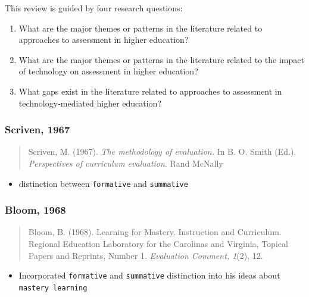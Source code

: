\documentclass[
]{book}
\providecommand{\tightlist}{%
  \setlength{\itemsep}{0pt}\setlength{\parskip}{0pt}}
\begin{document}
This review is guided by four research questions:

\begin{enumerate}
\def\labelenumi{\arabic{enumi}.}
\tightlist
\item
  What are the major themes or patterns in the literature related to approaches to assessment in higher education?\\
\item
  What are the major themes or patterns in the literature related to the impact of technology on assessment in higher education?\\
\item
  What gaps exist in the literature related to approaches to assessment in technology-mediated higher education?
\end{enumerate}

\hypertarget{scriven-1967}{%
\subsubsection*{Scriven, 1967}\label{scriven-1967}}

\begin{quote}
Scriven, M. (1967). \emph{The methodology of evaluation.} In B. O. Smith (Ed.), \emph{Perspectives of curriculum evaluation}. Rand McNally
\end{quote}

\begin{itemize}
\tightlist
\item
  distinction between \texttt{formative} and \texttt{summative}
\end{itemize}

\hypertarget{bloom-1968}{%
\subsubsection*{Bloom, 1968}\label{bloom-1968}}

\begin{quote}
Bloom, B. (1968). Learning for Mastery. Instruction and Curriculum. Regional Education Laboratory for the Carolinas and Virginia, Topical Papers and Reprints, Number 1. \emph{Evaluation Comment, 1}(2), 12.
\end{quote}

\begin{itemize}
\tightlist
\item
  Incorporated \texttt{formative} and \texttt{summative} distinction into his ideas about \texttt{mastery\ learning}
\end{itemize}
\end{document}
